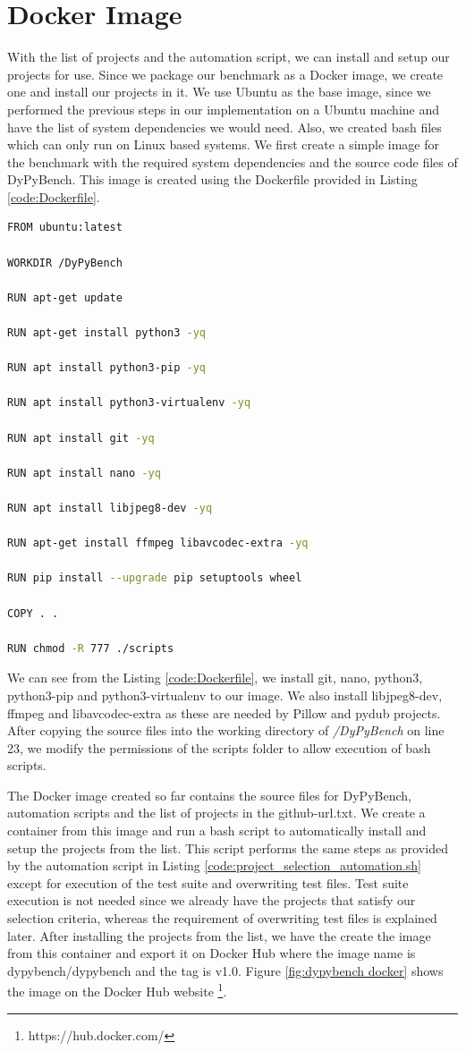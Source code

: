 \section{Docker Image}
\label{impl:Docker Image}
With the list of projects and the automation script, we can install and setup our projects for use.
Since we package our benchmark as a Docker image, we create one and install our projects in it.
We use Ubuntu as the base image, since we performed the previous steps in our implementation on a Ubuntu machine and have the list of system dependencies we would need.
Also, we created bash files which can only run on Linux based systems.
We first create a simple image for the benchmark with the required system dependencies and the source code files of DyPyBench.
This image is created using the Dockerfile provided in Listing \ref{code:Dockerfile}.
\begin{lstlisting}[caption=Dockerfile,label=code:Dockerfile,language=Bash]
FROM ubuntu:latest

WORKDIR /DyPyBench

RUN apt-get update

RUN apt-get install python3 -yq

RUN apt install python3-pip -yq

RUN apt install python3-virtualenv -yq

RUN apt install git -yq

RUN apt install nano -yq

RUN apt install libjpeg8-dev -yq

RUN apt-get install ffmpeg libavcodec-extra -yq

RUN pip install --upgrade pip setuptools wheel

COPY . .

RUN chmod -R 777 ./scripts 
\end{lstlisting}

We can see from the Listing \ref{code:Dockerfile}, we install git, nano, python3, python3-pip and python3-virtualenv to our image.
We also install libjpeg8-dev, ffmpeg and libavcodec-extra as these are needed by Pillow and pydub projects.
After copying the source files into the working directory of \textit{/DyPyBench} on line 23, we modify the permissions of the scripts folder to allow execution of bash scripts.

The Docker image created so far contains the source files for DyPyBench, automation scripts and the list of projects in the github-url.txt.
We create a container from this image and run a bash script to automatically install and setup the projects from the list.
This script performs the same steps as provided by the automation script in Listing \ref{code:project_selection_automation.sh} except for execution of the test suite and overwriting test files.
Test suite execution is not needed since we already have the projects that satisfy our selection criteria, whereas the requirement of overwriting test files is explained later. 
After installing the projects from the list, we have the create the image from this container and export it on Docker Hub where the image name is dypybench/dypybench and the tag is v1.0.
Figure \ref{fig:dypybench docker} shows the image on the Docker Hub website \footnote{https://hub.docker.com/}.


